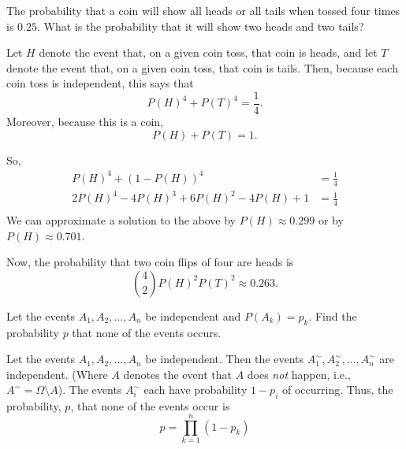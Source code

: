 \begin{problem}[Handout 5, \# 12]
  The probability that a coin will show all heads or all tails when tossed
  four times is \(0.25\). What is the probability that it will show two
  heads and two tails?
\end{problem}
\begin{solution}
  Let $H$ denote the event that, on a given coin toss, that coin is heads,
  and let $T$ denote the event that, on a given coin toss, that coin is
  tails. Then, because each coin toss is independent, this says that
  \[
    P(H)^4 + P(T)^4 = \frac{1}{4}.
  \]
  Moreover, because this is a coin,
  \[
    P(H) + P(T) = 1.
  \]

  So,
  \begin{align*}
    P(H)^4 + (1-P(H))^4 &= \frac{1}{4} \\
    2P(H)^4 -4P(H)^3 + 6P(H)^2 - 4P(H) +1 &= \frac{1}{4} \\
  \end{align*}
  We can approximate a solution to the above by $P(H) \approx 0.299$ or by
  $P(H) \approx 0.701$.

  Now, the probability that two coin flips of four are heads is
  \[
    \binom{4}{2}P(H)^2P(T)^2 \approx 0.263.
  \]
\end{solution}
\newpage

\begin{problem}[Handout 5, \# 13]
  Let the events \(A_1, A_2,\dotsc,A_n\) be independent and
  \(P(A_k)=p_k\). Find the probability \(p\) that none of the events
  occurs.
\end{problem}
\begin{solution}
  Let the events $A_1, A_2,\dotsc, A_n$ be independent. Then the events
  $A_1^\sim, A_2^\sim, \dotsc, A_n^\sim$ are independent. (Where $A$
  denotes the event that $A$ does \emph{not} happen, i.e.,
  \(A^\sim=\Omega\setminus A\)). The events $A_i^\sim$ each have
  probability $1-p_i$ of occurring. Thus, the probability, $p$, that none
  of the events occur is
  \[
    p = \prod_{k=1}^n (1-p_k)
  \]
\end{solution}
\newpage

